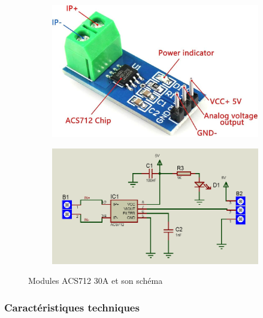 \begin{figure}[H]
	\centering
	\begin{subfigure}{0.40\textwidth} %
		\centering
		\includegraphics[width=\linewidth]{./img/composants/ACS712.jpg}
		\label{fig:acs712a}
	\end{subfigure}
	\hfill
	\begin{subfigure}{0.55\textwidth} %
		\centering
		\includegraphics[width=\linewidth]{./img/composants/ACS.PNG}
		\label{fig:acs712b}
	\end{subfigure}
	\caption{Modules ACS712 30A  \cite{1} et son schéma}
	\label{fig:combined}
\end{figure}
\subsubsection*{Caractéristiques techniques }

